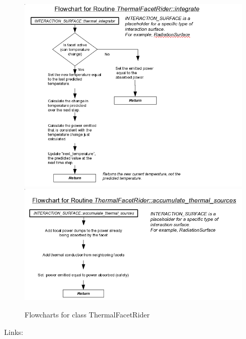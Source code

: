 \begin{figure}[!ht]
  \includegraphics[width = 5.5 in]{figs/flowchart/flow_facet_thermal_integrate.png}
  \label{fig:flow_facet_thermal_integrate}
  \includegraphics[width = 5.5 in]{figs/flowchart/flow_facet_accumulate_thermal_sources.png}
  \label{fig:flow_facet_accumulate_thermal_sources}
  \caption{Flowcharts for class ThermalFacetRider }
\end{figure}
Links: \newline
{}\newline
{}\newline
\clearpage

